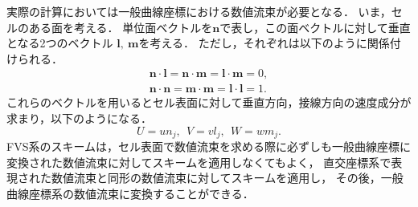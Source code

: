 実際の計算においては一般曲線座標における数値流束が必要となる．
いま，セルのある面を考える．
単位面ベクトルを$\bm{n}$で表し，この面ベクトルに対して垂直となる2つのベクトル
$\bm{l},\ \bm{m}$を考える．
ただし，それぞれは以下のように関係付けられる．
\begin{align}
    \bm{n}\cdot\bm{l} = \bm{n}\cdot\bm{m} = \bm{l}\cdot\bm{m} = 0, \\
    \bm{n}\cdot\bm{n} = \bm{m}\cdot\bm{m} = \bm{l}\cdot\bm{l} = 1.
\end{align}
これらのベクトルを用いるとセル表面に対して垂直方向，接線方向の速度成分が求まり，以下のようになる．
\begin{equation}
    U = un_j,\ \ V = vl_j,\ \ W = wm_j.
\end{equation}
FVS系のスキームは，セル表面で数値流束を求める際に必ずしも一般曲線座標に変換された数値流束に対してスキームを適用しなくてもよく，
直交座標系で表現された数値流束と同形の数値流束に対してスキームを適用し，
その後，一般曲線座標系の数値流束に変換することができる．

